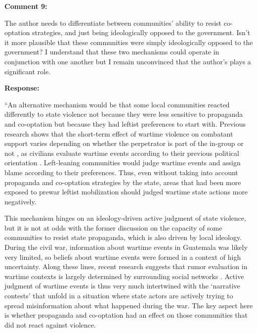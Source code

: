 \documentclass[12pt, a4paper, notitlepage]{article}
\begin{document}
\vspace{15pt}
\noindent\textbf{Comment 9:}
\begin{displayquote}
The author needs to differentiate between communities' ability to resist co-optation strategies, and just being ideologically opposed to the government. Isn't it more plausible that these communities were simply ideologically opposed to the government? I understand that these two mechanisms could operate in conjunction with one another but I remain unconvinced that the author's plays a significant role.
\end{displayquote}

\noindent\textbf{Response:} {}


``An alternative mechanism would be that some local communities reacted differently to state violence not because they were less sensitive to propaganda and co-optation but because they had leftist preferences to start with.
Previous research shows that the short-term effect of wartime violence on combatant support varies depending on whether the perpetrator is part of the in-group or not \citep{Lyall:2013aa}, as civilians evaluate wartime events according to their previous political orientation \citep{Silverman:2019aa, Pechenkina:2020ul}.
Left-leaning communities would judge wartime events and assign blame according to their preferences.
Thus, even without taking into account propaganda and co-optation strategies by the state, areas that had been more exposed to prewar leftist mobilization should judged wartime state actions more negatively.

This mechanism hinges on an ideology-driven active judgment of state violence, but it is not at odds with the former discussion on the capacity of some communities to resist state propaganda, which is also driven by local ideology.
During the civil war, information about wartime events in Guatemala was likely very limited, so beliefs about wartime events were formed in a context of high uncertainty.
Along these lines, recent research suggests that rumor evaluation in wartime contexts is largely determined by surrounding social networks \citep{Schon:2021wf}.
Active judgment of wartime events is thus very much intertwined with the `narrative contests' that unfold in a situation where state actors are actively trying to spread misinformation about what happened during the war.
The key aspect here is whether propaganda and co-optation had an effect on those communities that did not react against violence.
\end{document}
